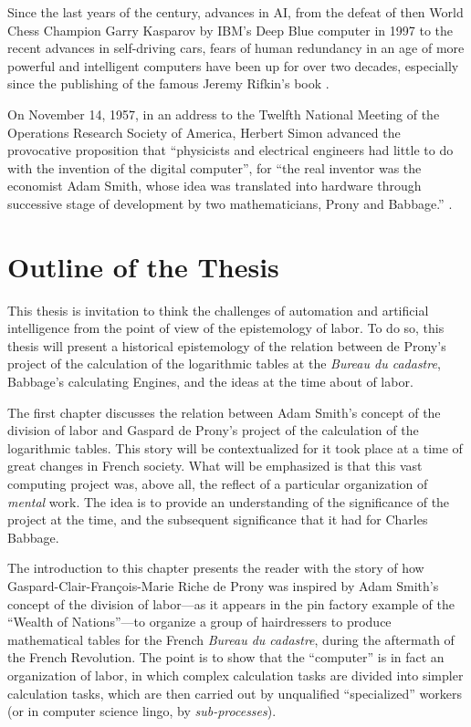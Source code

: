 \documentclass[version=last,draft=true,paper=A4,portrait,twoside=true,twocolumn=false,headinclude=false,footinclude=false,fontsize=12,BCOR=20mm,DIV=calc,pagesize=auto,titlepage=firstiscover,mpinclude=true,open=right,chapterprefix=true,numbers=autoendperiod,headsepline=false,headings=twolinechapter,parskip=false]{scrbook}
\begin{document}
Since the last years of the  century, advances in AI, from 
the defeat of then World Chess Champion Garry Kasparov by IBM's Deep Blue
computer in 1997 to the recent advances in self-driving cars, fears of
human redundancy in an age of more powerful and intelligent computers have
been up for over two decades, especially since the publishing of the famous
Jeremy Rifkin's book . 


On November 14, 1957, in an address to the Twelfth National Meeting of the
Operations Research Society of America, Herbert Simon advanced the
provocative proposition that ``physicists and electrical engineers had
little to do with the invention of the digital computer'', for ``the real
inventor was the economist Adam Smith, whose idea was translated into
hardware through successive stage of development by two mathematicians,
Prony and Babbage.'' \cite{simon_newell1958}. 

\section{Outline of the Thesis}
\label{sec:org13401f7}
This thesis is invitation to think the challenges of automation and
artificial intelligence from the point of view of the epistemology of
labor. To do so, this thesis will present a historical epistemology of the
relation between de Prony's project of the calculation of the logarithmic
tables at the \emph{Bureau du cadastre}, Babbage's calculating Engines, and the
ideas at the time about of labor.

The first chapter discusses the relation between Adam Smith's concept of
the division of labor and Gaspard de Prony's project of the calculation of
the logarithmic tables. This story will be contextualized for it took place
at a time of great changes in French society. What will be emphasized is
that this vast computing project was, above all, the reflect of a
particular organization of \emph{mental} work. The idea is to provide an
understanding of the significance of the project at the time, and the
subsequent significance that it had for Charles Babbage.

The introduction to this chapter presents the reader with the story of how
Gaspard-Clair-François-Marie Riche de Prony was inspired by Adam Smith's
concept of the division of labor---as it appears in the pin factory example
of the ``Wealth of Nations''---to organize a group of hairdressers to
produce mathematical tables for the French \emph{Bureau du cadastre}, during the
aftermath of the French Revolution. The point is to show that the
``computer'' is in fact an organization of labor, in which complex
calculation tasks are divided into simpler calculation tasks, which are
then carried out by unqualified ``specialized'' workers (or in computer
science lingo, by \emph{sub-processes}).
\end{document}
